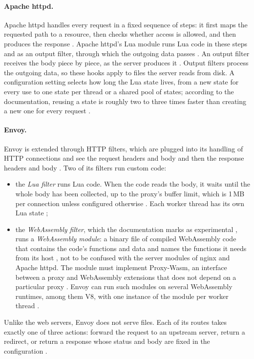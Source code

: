 \documentclass{rptuma}
\begin{document}
\paragraph{Apache httpd.} Apache httpd handles every request in a fixed sequence of steps: it first
maps the requested path to a resource, then checks whether access is allowed, and then produces the
response \cite{apache_request}. Apache httpd's Lua module runs Lua code in these steps and as an
output filter, through which the outgoing data passes \cite{apache_modlua}. An output filter
receives the body piece by piece, as the server produces it \cite{apache_modlua}. Output filters process
the outgoing data, so these hooks apply to files the server reads from disk. A configuration setting
selects how long the Lua state lives, from a new state for every use to one state per thread or a
shared pool of states; according to the documentation, reusing a state is roughly two to three
times faster than creating a new one for every request \cite{apache_modlua}.

\paragraph{Envoy.} Envoy is extended through HTTP filters, which are plugged into its handling of
HTTP connections and see the request headers and body and then the response headers and body
\cite{envoy_what,envoy_httpfilters}. Two of its filters run custom code:
\begin{itemize}
  \item the \emph{Lua filter} runs Lua code. When the code reads the body, it waits until the whole
    body has been collected, up to the proxy's buffer limit, which is 1\,MB per connection unless
    configured otherwise \cite{envoy_listener}. Each worker thread has its own Lua
    state \cite{envoy_lua};
  \item the \emph{WebAssembly filter}, which the documentation marks as experimental
    \cite{envoy_wasm_filter}, runs a \emph{WebAssembly module}: a binary file of compiled WebAssembly
    code that contains the code's functions and data and names the functions it needs from its host
    \cite{haas2017wasm}, not to be confused with the server modules of nginx and Apache httpd. The
    module must implement Proxy-Wasm, an interface
    between a proxy and WebAssembly extensions that does not depend on a particular proxy
    \cite{proxywasm_spec}. Envoy can run such modules on several WebAssembly runtimes, among them V8,
    with one instance of the module per worker thread \cite{envoy_wasm}.
\end{itemize}
Unlike the web servers, Envoy does not serve files. Each of its routes takes exactly one of three
actions: forward the request to an upstream server, return a redirect, or return a response whose
status and body are fixed in the configuration \cite{envoy_route}.
\end{document}
